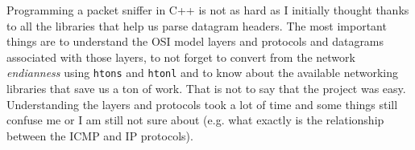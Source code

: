 \documentclass[a4paper]{article}
\begin{document}
  Programming a packet sniffer in C++ is not as hard as I initially thought
  thanks to all the libraries that help us parse datagram headers. The most
  important things are to understand the OSI model layers and protocols and 
  datagrams associated with those layers, to not forget to convert from the 
  network \textit{endianness} using \verb|htons| and \verb|htonl| and to know
  about the available networking libraries that save us a ton of work. That
  is not to say that the project was easy. Understanding the layers and 
  protocols took a lot of time and some things still confuse me or I am still 
  not sure about (e.g. what exactly is the relationship between the ICMP and IP
  protocols).

  \newpage


  
  
\end{document}

